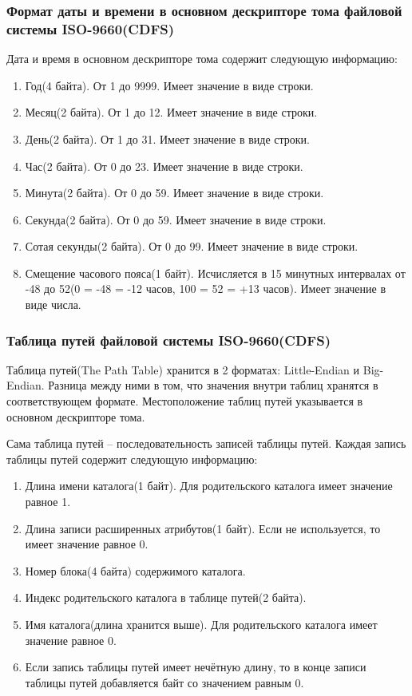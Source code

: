 \subsubsection{Формат даты и времени в основном дескрипторе тома файловой системы ISO-9660(CDFS)}

Дата и время в основном дескрипторе тома содержит следующую информацию:

\begin{enumerate}
	\item Год(4 байта). От 1 до 9999. Имеет значение в виде строки.
	\item Месяц(2 байта). От 1 до 12. Имеет значение в виде строки.
	\item День(2 байта). От 1 до 31. Имеет значение в виде строки.
	\item Час(2 байта). От 0 до 23. Имеет значение в виде строки.
	\item Минута(2 байта). От 0 до 59. Имеет значение в виде строки.
	\item Секунда(2 байта). От 0 до 59. Имеет значение в виде строки.
	\item Сотая секунды(2 байта). От 0 до 99. Имеет значение в виде строки.
	\item Смещение часового пояса(1 байт). Исчисляется в 15 минутных интервалах от -48 до 52(0 = -48 = -12 часов, 100 = 52 = +13 часов). Имеет значение в виде числа.
\end{enumerate}

\subsubsection{Таблица путей файловой системы ISO-9660(CDFS)}

Таблица путей(The Path Table) хранится в 2 форматах: Little-Endian и Big-Endian. Разница между ними в том, что значения внутри таблиц хранятся в соответствующем формате. Местоположение таблиц путей указывается в основном дескрипторе тома.

Сама таблица путей -- последовательность записей таблицы путей. Каждая запись таблицы путей содержит следующую информацию:

\begin{enumerate}
\item Длина имени каталога(1 байт). Для родительского каталога имеет значение равное 1.
\item Длина записи расширенных атрибутов(1 байт). Если не используется, то имеет значение равное 0.
\item Номер блока(4 байта) содержимого каталога.
\item Индекс родительского каталога в таблице путей(2 байта).
\item Имя каталога(длина хранится выше). Для родительского каталога имеет значение равное 0. 
\item Если запись таблицы путей имеет нечётную длину, то в конце записи таблицы путей добавляется байт со значением равным 0.
\end{enumerate}

